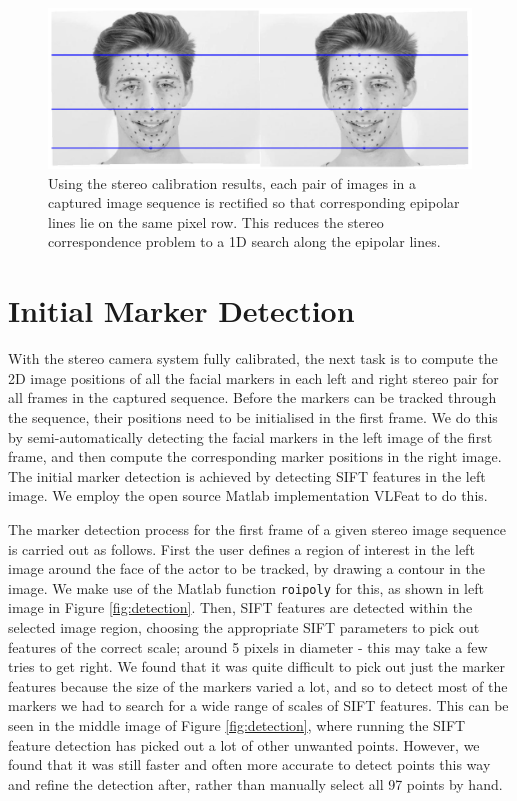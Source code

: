 \begin{figure}[htbp!]
\centering
\includegraphics[width=\textwidth]{img/epipolarlines}
	\caption{Using the stereo calibration results, each pair of images in a captured image sequence is rectified so that corresponding epipolar lines lie on the same pixel row. This reduces the stereo correspondence problem to a 1D search along the epipolar lines.}
	\label{fig:epipolarlines}
\end{figure}

\section{Initial Marker Detection}

With the stereo camera system fully calibrated, the next task is to compute the 2D image positions of all the facial markers in each left and right stereo pair for all frames in the captured sequence. Before the markers can be tracked through the sequence, their positions need to be initialised in the first frame. We do this by semi-automatically detecting the facial markers in the left image of the first frame, and then compute the corresponding marker positions in the right image. The initial marker detection is achieved by detecting SIFT features in the left image. We employ the open source Matlab implementation VLFeat \cite{vedaldi08vlfeat} to do this. 

The marker detection process for the first frame of a given stereo image sequence is carried out as follows. First the user defines a region of interest in the left image around the face of the actor to be tracked, by drawing a contour in the image. We make use of the Matlab function \texttt{roipoly} for this, as shown in left image in Figure \ref{fig:detection}. Then, SIFT features are detected within the selected image region, choosing the appropriate SIFT parameters to pick out features of the correct scale; around 5 pixels in diameter - this may take a few tries to get right. We found that it was quite difficult to pick out just the marker features because the size of the markers varied a lot, and so to detect most of the markers we had to search for a wide range of scales of SIFT features. This can be seen in the middle image of Figure \ref{fig:detection}, where running the SIFT feature detection has picked out a lot of other unwanted points. However, we found that it was still faster and often more accurate to detect points this way and refine the detection after, rather than manually select all 97 points by hand.


